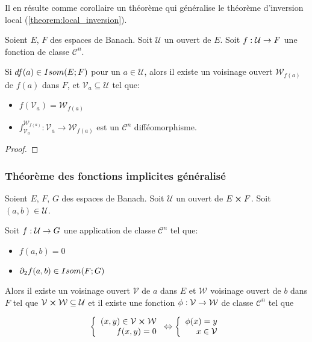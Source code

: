 Il en résulte comme corollaire un théorème qui généralise le théorème
d'inversion local (\ref{theorem:local_inversion}).

\begin{theorem}
	Soient $E$, $F$ des espaces de Banach. Soit $\mathcal{U}$ un ouvert de $E$.
	Soit $f : \mathcal{U} \rightarrow F$ une fonction de classe
	$\mathcal{C}^{n}$.

	Si $df(a) \in Isom(E; F)$ pour un $a \in \mathcal{U}$, alors il existe un
	voisinage ouvert $\mathcal{W}_{f(a)}$ de $f(a)$ dans $F$, et $\mathcal{V}_{a} \subseteq
	\mathcal{U}$ tel que:

	\begin{itemize}
		\item $f(\mathcal{V}_{a}) = \mathcal{W}_{f(a)}$
		\item $f_{\mathcal{V}_{a}}^{\mathcal{W}_{f(a)}} : \mathcal{V}_{a} \rightarrow
			\mathcal{W}_{f(a)}$ est un $\mathcal{C}^{n}$ difféomorphisme.
	\end{itemize}
\end{theorem}

\ifdefined\outputproof
\begin{proof}

\end{proof}
\fi

\subsubsection{Théorème des fonctions implicites généralisé}

\begin{theorem}
	Soient $E$, $F$, $G$ des espaces de Banach.
	Soit $\mathcal{U}$ un ouvert de $E \cross F$.
	Soit $(a, b) \in \mathcal{U}$.

	Soit $f : \mathcal{U} \rightarrow G$ une application de classe
	$\mathcal{C}^{n}$ tel que:

	\begin{itemize}
		\item $f(a, b) = 0$
		\item $\partial_{2}f (a, b) \in Isom(F; G)$
	\end{itemize}

	Alors il existe un voisinage ouvert $\mathcal{V}$ de $a$ dans $E$ et
	$\mathcal{W}$ voisinage ouvert de $b$ dans $F$ tel que $\mathcal{V}
	\cross \mathcal{W} \subseteq \mathcal{U}$ et il existe une fonction
	$\phi : \mathcal{V} \rightarrow \mathcal{W}$ de classe $\mathcal{C}^{n}$
	tel que

	\begin{align*}
	\left\{
		\begin{array}{r c l}
			(x, y) \in \mathcal{V} \cross \mathcal{W} \\
			f(x, y) = 0
		\end{array}
	\right.
	\Leftrightarrow
	\left\{
		\begin{array}{r c l}
			\phi(x) = y \\
			x \in \mathcal{V}
		\end{array}
	\right.
	\end{align*}
\end{theorem}

